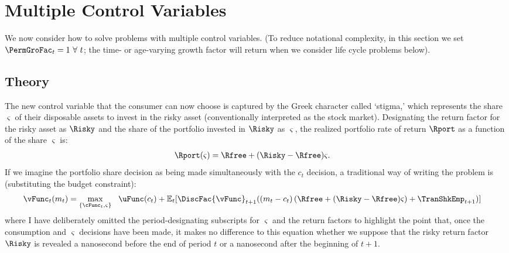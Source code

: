 \documentclass[titlepage, headings=optiontotocandhead]{Resources/texmf-local/tex/latex/econtex}
\begin{document}
\section{Multiple Control Variables}

We now consider how to solve problems with multiple control variables.  (To reduce notational complexity, in this section we set $\PermGroFac_{t}=1~\forall~t$; the time- or age-varying growth factor will return when we consider life cycle problems below).

\subsection{Theory}\label{subsec:MCTheory}
The new control variable that the consumer can now choose is captured by the Greek character called `stigma,' which represents the  share $\varsigma$ of their disposable assets to invest in the risky asset (conventionally interpreted as the stock market).  Designating the return factor for the risky asset as $\Risky$ and the share of the portfolio invested in $\Risky$ as $\varsigma$, the realized portfolio rate of return $\Rport$ as a function of the share $\varsigma$ is:
\begin{equation}\begin{gathered}\begin{aligned}
      \Rport(\varsigma) &= \Rfree+(\Risky-\Rfree)\varsigma \label{eq:Shr}.
    \end{aligned}\end{gathered}\end{equation}
If we imagine the portfolio share decision as being made simultaneously with the ${c}_{t}$ decision, a traditional way of writing the problem is (substituting the budget constraint):
\begin{equation}\begin{gathered}\begin{aligned}
      {\vFunc}_{t}({m}_{t})  & = \max_{\{\cFunc_{t},\varsigma\}} ~~  \uFunc({c}_{t}) +  \Ex_{{t}}[\DiscFac {\vFunc}_{t+1}(({m}_{t}-{c}_{t})\left({\Rfree+(\Risky-\Rfree)\varsigma}\right) +        {\TranShkEmp}_{t+1})] \label{eq:Bellmanundated}
    \end{aligned}\end{gathered}\end{equation}
where I have deliberately omitted the period-designating subscripts for $\varsigma$ and the return factors to highlight the point that, once the consumption and $\varsigma$ decisions have been made, it makes no difference to this equation whether we suppose that the risky return factor $\Risky$ is revealed a nanosecond before the end of period $t$ or a nanosecond after the beginning of $t+1$.
\end{document}
